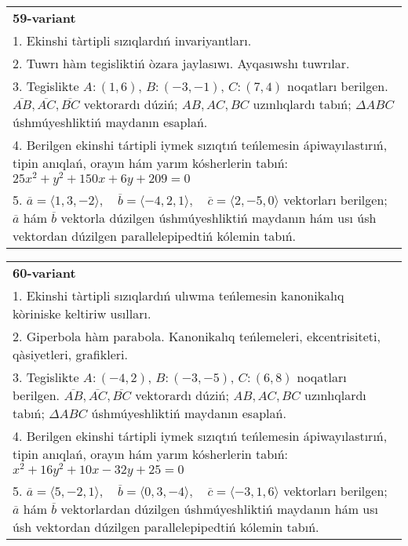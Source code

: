 \documentclass{article}
\begin{document}
\begin{tabular}{m{17cm}}
\textbf{59-variant}\\
1. Ekinshi tàrtipli sızıqlardıń invariyantları.\\

2. Tuwrı hàm tegisliktiń òzara jaylasıwı. Ayqasıwshı tuwrılar.\\

3. Tegislikte $A: (1, 6)$, $B: (-3, -1)$, $C: (7, 4)$ noqatları berilgen. $\overline{AB}, \overline{AC}, \overline{BC}$ vektorardı dúziń; $AB, AC, BC$ uzınlıqlardı tabıń; $\Delta ABC$ úshmúyeshliktiń maydanın esaplań. \\

4. Berilgen ekinshi tártipli iymek sızıqtıń teńlemesin ápiwayılastırıń, tipin anıqlań, orayın hám yarım kósherlerin tabıń: $25x^2+y^2+150x+6y+209=0$\\

5. \(\overline{a} = \langle 1, 3, -2 \rangle, \quad \overline{b} = \langle -4, 2, 1 \rangle, \quad \overline{c} = \langle 2, -5, 0 \rangle\) vektorları berilgen; \(\overline{a}\) hám \(\overline{b}\) vektorla dúzilgen úshmúyeshliktiń maydanın hám usı úsh vektordan dúzilgen parallelepipedtiń kólemin tabıń.
\end{tabular}
\vspace{1cm}


\begin{tabular}{m{17cm}}
\textbf{60-variant}\\
1. Ekinshi tàrtipli sızıqlardıń ulıwma teńlemesin kanonikalıq kòriniske keltiriw usılları.\\

2. Giperbola hàm parabola. Kanonikalıq teńlemeleri, ekcentrisiteti, qàsiyetleri, grafikleri.\\

3. Tegislikte $A: (-4, 2)$, $B: (-3, -5)$, $C: (6, 8)$ noqatları berilgen. $\overline{AB}, \overline{AC}, \overline{BC}$ vektorardı dúziń; $AB, AC, BC$ uzınlıqlardı tabıń; $\Delta ABC$ úshmúyeshliktiń maydanın esaplań. \\

4. Berilgen ekinshi tártipli iymek sızıqtıń teńlemesin ápiwayılastırıń, tipin anıqlań, orayın hám yarım kósherlerin tabıń: $x^2+16y^2+10x-32y+25=0$\\

5. \(\overline{a} = \langle 5, -2, 1 \rangle, \quad \overline{b} = \langle 0, 3, -4 \rangle, \quad \overline{c} = \langle -3, 1, 6 \rangle\) vektorları berilgen; \(\overline{a}\) hám \(\overline{b}\) vektorlardan dúzilgen úshmúyeshliktiń maydanın hám usı úsh vektordan dúzilgen parallelepipedtiń kólemin tabıń.
\end{tabular}
\vspace{1cm}
\end{document}
